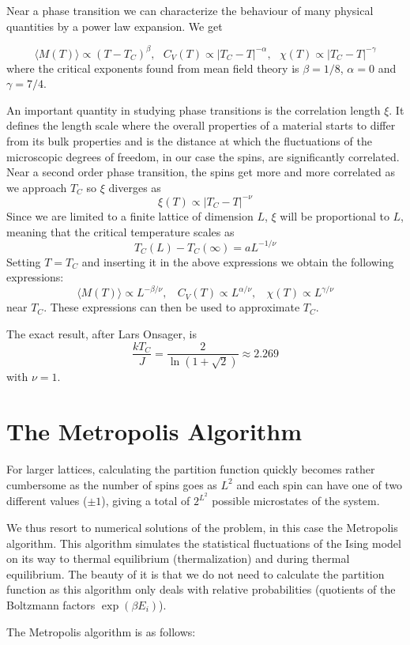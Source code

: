 \documentclass[english, 12pt]{article}
\newcommand{\f}{\frac}
\begin{document}
Near a phase transition we can characterize the behaviour of many physical quantities by a power law expansion. We get

$$\langle M(T)\rangle \propto (T-T_C)^\beta,\ \ \ C_V(T) \propto |T_C-T|^{-\alpha},\ \ \ \chi(T) \propto |T_C-T|^{-\gamma}$$
where the critical exponents found from mean field theory is $\beta = 1/8$, $\alpha = 0$ and $\gamma = 7/4$.

An important quantity in studying phase transitions is the correlation length $\xi$. It defines the length scale where the overall properties of a material starts to differ from its bulk properties and is the distance at which the fluctuations of the microscopic degrees of freedom, in our case the spins, are significantly correlated. Near a second order phase transition, the spins get more and more correlated as we approach $T_C$ so $\xi$ diverges as
$$\xi(T) \propto |T_C-T|^{-\nu}$$
Since we are limited to a finite lattice of dimension $L$, $\xi$ will be proportional to $L$, meaning that the critical temperature scales as $$T_C(L)-T_C(\infty) = aL^{-1/\nu}$$
Setting $T=T_C$ and inserting it in the above expressions we obtain the following expressions:
$$\langle M(T)\rangle \propto L^{-\beta/\nu},\ \ \ \ C_V(T)\propto L^{\alpha/\nu},\ \ \ \ \chi(T) \propto L^{\gamma/\nu}$$
near $T_C$.
These expressions can then be used to approximate $T_C$.

The exact result, after Lars Onsager, is 
$$\f{kT_C}{J} = \f{2}{\ln(1+\sqrt{2})} \approx 2.269$$
with $\nu = 1$.


\section{The Metropolis Algorithm}
For larger lattices, calculating the partition function quickly becomes rather cumbersome as the number of spins goes as $L^2$ and each spin can have one of two different values ($\pm1$), giving a total of $2^{L^2}$ possible microstates of the system.

We thus resort to numerical solutions of the problem, in this case the Metropolis algorithm. This algorithm simulates the statistical fluctuations of the Ising model on its way to thermal equilibrium (thermalization) and during thermal equilibrium. The beauty of it is that we do not need to calculate the partition function as this algorithm only deals with relative probabilities (quotients of the Boltzmann factors $\exp(\beta E_i)$).

The Metropolis algorithm is as follows:
\end{document}
